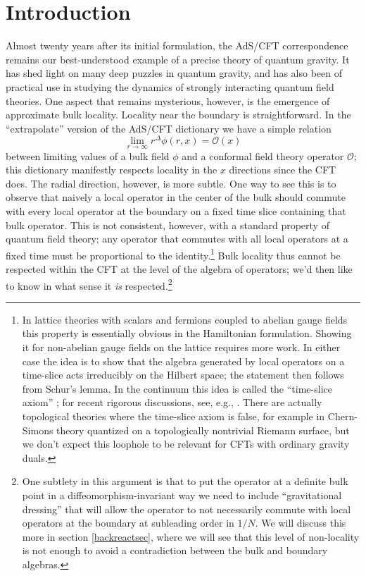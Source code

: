 \documentclass[11pt]{article}
\newcommand{\be}{\begin{equation}}
\newcommand{\ee}{\end{equation}}
\newcommand{\mO}{\mathcal{O}}
\begin{document}
\section{Introduction}
Almost twenty years after its initial formulation, the AdS/CFT correspondence remains our best-understood example of a precise theory of quantum gravity.  It has shed light on many deep puzzles in quantum gravity, and has also been of practical use in studying the dynamics of strongly interacting quantum field theories.  One aspect that remains mysterious, however, is the emergence of approximate bulk locality.  Locality near the boundary is straightforward. In the ``extrapolate'' version of the AdS/CFT dictionary we have a simple relation \cite{Banks:1998dd,Harlow:2011ke}
\be\label{extd}
\lim_{r\to \infty}r^{\Delta}\phi(r,x)=\mO(x)
\ee
between limiting values of a bulk field $\phi$ and a conformal field theory operator $\mO$; this dictionary manifestly respects locality in the $x$ directions since the CFT does.  The radial direction, however, is more subtle. One way to see this is to observe that naively a local operator in the center of the bulk should commute with every local operator at the boundary on a fixed time slice containing that bulk operator. This is not consistent, however, with a standard property of quantum field theory; any operator that commutes with all local operators at a fixed time must be proportional to the identity.\footnote{In lattice theories with scalars and fermions coupled to abelian gauge fields this property is essentially obvious in the Hamiltonian formulation.  Showing it for non-abelian gauge fields on the lattice requires more work.  In either case the idea is to show that the algebra generated by local operators on a time-slice acts irreducibly on the Hilbert space; the statement then follows from Schur's lemma.  In the continuum this idea is called the ``time-slice axiom'' \cite{Streater:1989vi,Haag:1992hx}; for recent rigorous discussions, see, e.g., \cite{Chilian:2008ye,Benini:2013ita}.  There are actually topological theories where the time-slice axiom is false, for example in Chern-Simons theory quantized on a topologically nontrivial Riemann surface, but we don't expect this loophole to be relevant for CFTs with ordinary gravity duals.%
}
Bulk locality thus cannot be respected within the CFT at the level of the algebra of operators;  we'd then like to know in what sense it \textit{is} respected.\footnote{One subtlety in this argument is that to put the operator at a definite bulk point in a diffeomorphism-invariant way we need to include ``gravitational dressing'' that will allow the operator to not necessarily commute with local operators at the boundary at subleading order in $1/N$.  We will discuss this more in section \ref{backreactsec}, where we will see that this level of non-locality is not enough to avoid a contradiction between the bulk and boundary algebras.}  
\end{document}
